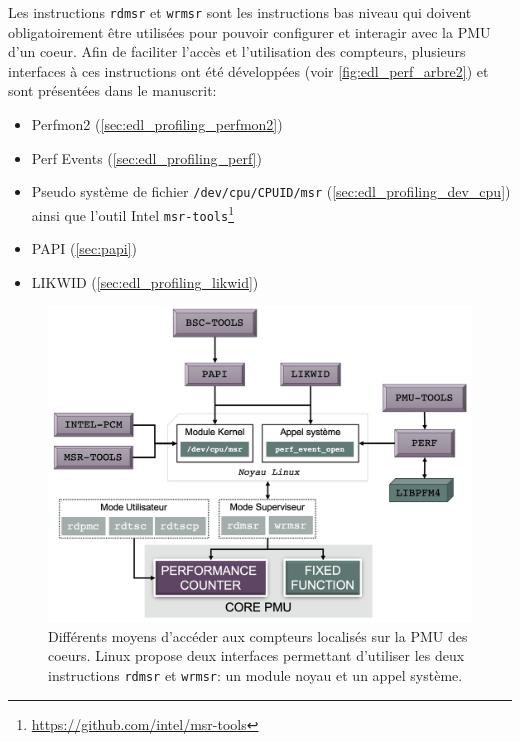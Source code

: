     Les instructions \verb|rdmsr| et \verb|wrmsr| sont les instructions bas niveau qui doivent obligatoirement être utilisées pour pouvoir configurer et interagir avec la PMU d'un coeur. Afin de faciliter l'accès et l'utilisation des compteurs, plusieurs interfaces à ces instructions ont été développées (voir \autoref{fig:edl_perf_arbre2}) et sont présentées dans le manuscrit:
    \begin{itemize}
        \item Perfmon2 (\autoref{sec:edl_profiling_perfmon2})
        \item Perf Events (\autoref{sec:edl_profiling_perf})
        \item Pseudo système de fichier \verb|/dev/cpu/CPUID/msr| (\autoref{sec:edl_profiling_dev_cpu}) ainsi que l'outil Intel \verb|msr-tools|\footnote{\url{https://github.com/intel/msr-tools}}
        \item PAPI (\autoref{sec:papi})
        \item LIKWID (\autoref{sec:edl_profiling_likwid})
        
    \end{itemize}

    \begin{figure}[ht]
    \center
    \includegraphics[width=16cm]{images/edl_perf_arbre.png}
    \caption{\label{fig:edl_perf_arbre2} Différents moyens d'accéder aux compteurs localisés sur la PMU des coeurs. Linux propose deux interfaces permettant d'utiliser les deux instructions \texttt{rdmsr} et \texttt{wrmsr}: un module noyau et un appel système.}
    \end{figure}



